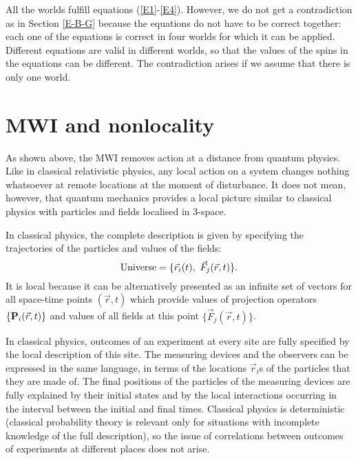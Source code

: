 \documentclass[11pt]{article}
\begin{document}
All the worlds  fulfill equations  (\ref{E1}-\ref{E4}). However, we do not get a contradiction as in Section \ref{E-B-G} because the equations do not have to be correct together: each one of the equations is correct in  four worlds for which it can be applied. Different equations are valid in different worlds, so that the  values of the spins in the equations can be different. The contradiction arises  if we assume that there is only one world.

\section{MWI and nonlocality }

As shown above, the MWI removes action at a distance from quantum physics. Like in classical relativistic physics,   any local action on a system changes nothing whatsoever at remote locations at the moment of disturbance. It does not mean, however, that quantum mechanics provides a local picture similar to classical physics with particles and fields localised in 3-space.

In classical physics, the complete description is given by specifying the trajectories of the particles and values of the fields:
\begin{equation}\label{ClUni}
{\rm Universe} = \{\vec{r}_i(t),~ \vec F_j(\vec{r},t)\}.
\end{equation}
It is local because it can be alternatively presented as an infinite set of vectors for all space-time points $(\vec{r},t)$ which provide values of projection operators $\{{\rm \bf P}_i(\vec{r},t)\}$ and values of all fields at this point $\{\vec F_j(\vec{r},t) \}$.

In classical physics, outcomes of an experiment at every site are fully specified by the local description of this site. The measuring devices and the observers can be expressed in the same language, in terms of the locations  $\vec{r}_i$s of the particles that they are made of. The final positions of the particles of the measuring devices are fully explained by their initial states and by the local interactions occurring  in the interval between the initial and final times.   Classical physics is deterministic (classical probability theory is relevant only for situations with incomplete knowledge of the full description), so the issue of correlations between outcomes of experiments at different places does not arise.
\end{document}
